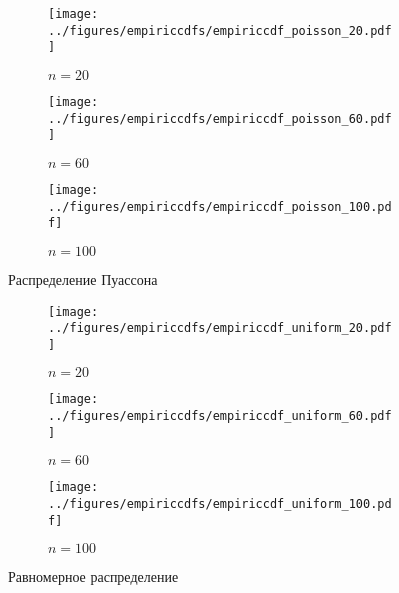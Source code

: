 \documentclass[12pt]{report}
\begin{document}
	\begin{figure}[H]
		\centering
		\begin{subfigure}[t]{.3\linewidth}
			\centering\texttt{[image: ../figures/empiriccdfs/empiriccdf\_poisson\_20.pdf]}
			\caption*{$n = 20$}
		\end{subfigure}
		\begin{subfigure}[t]{.3\linewidth}
			\centering\texttt{[image: ../figures/empiriccdfs/empiriccdf\_poisson\_60.pdf]}
			\caption*{$n = 60$}
		\end{subfigure}
		\begin{subfigure}[t]{.3\linewidth}
			\centering\texttt{[image: ../figures/empiriccdfs/empiriccdf\_poisson\_100.pdf]}
			\caption*{$n = 100$}
		\end{subfigure}
		\caption{Распределение Пуассона}
	\end{figure}
	\begin{figure}[H]
		\centering
		\begin{subfigure}[t]{.3\linewidth}
			\centering\texttt{[image: ../figures/empiriccdfs/empiriccdf\_uniform\_20.pdf]}
			\caption*{$n = 20$}
		\end{subfigure}
		\begin{subfigure}[t]{.3\linewidth}
			\centering\texttt{[image: ../figures/empiriccdfs/empiriccdf\_uniform\_60.pdf]}
			\caption*{$n = 60$}
		\end{subfigure}
		\begin{subfigure}[t]{.3\linewidth}
			\centering\texttt{[image: ../figures/empiriccdfs/empiriccdf\_uniform\_100.pdf]}
			\caption*{$n = 100$}
		\end{subfigure}
		\caption{Равномерное распределение}
	\end{figure}
\end{document}
